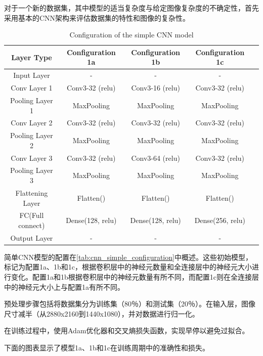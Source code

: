对于一个新的数据集，其中模型的适当复杂度与给定图像复杂度的不确定性，首先采用基本的CNN架构来评估数据集的特性和图像的复杂性。
\begin{table}[H]
\centering
\caption{Configuration of the simple CNN model}
\begin{tabular}{ccccc}
    \toprule
    \textbf{Layer Type} & \textbf{Configuration 1a} & \textbf{Configuration 1b} & \textbf{Configuration 1c} \\
    \midrule
    Input Layer & - & - & - \\
    Conv Layer 1 & Conv3-32 (relu) & Conv3-16 (relu) & Conv3-32 (relu) \\
    Pooling Layer 1 & MaxPooling & MaxPooling& MaxPooling \\
    Conv Layer 2 & Conv3-32 (relu) & Conv3-32 (relu) & Conv3-32 (relu) \\
    Pooling Layer 2 & MaxPooling & MaxPooling& MaxPooling \\
    Conv Layer 3 & Conv3-32 (relu) & Conv3-64 (relu) & Conv3-32 (relu) \\
    Pooling Layer 3 & MaxPooling & MaxPooling& MaxPooling \\
    Flattening Layer & Flatten() & Flatten() & Flatten() \\
    FC(Full connect) & Dense(128, relu) & Dense(128, relu) & Dense(256, relu) \\
    Output Layer & - & - & - \\
    \bottomrule
\end{tabular}
\label{tab:cnn_simple_configuration}
\end{table}

简单CNN模型的配置在\autoref{tab:cnn_simple_configuration}中概述。这些初始模型，标记为配置1a、1b和1c，根据卷积层中的神经元数量和全连接层中的神经元大小进行变化。配置1a和1b根据卷积层中的神经元数量有所不同，而配置1c则在全连接层中的神经元大小上与配置1a有所不同。

预处理步骤包括将数据集分为训练集（80％）和测试集（20％）。在输入层，图像尺寸减半（从2880x2160到1440x1080），并对数据进行归一化。

在训练过程中，使用Adam优化器和交叉熵损失函数，实现早停以避免过拟合。

下面的图表显示了模型1a、1b和1c在训练周期中的准确性和损失。

